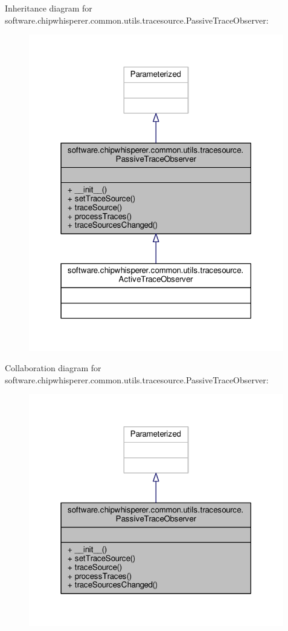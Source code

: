 Inheritance diagram for software.\+chipwhisperer.\+common.\+utils.\+tracesource.\+Passive\+Trace\+Observer\+:\nopagebreak
\begin{figure}[H]
\begin{center}
\leavevmode
\includegraphics[width=316pt]{d2/d85/classsoftware_1_1chipwhisperer_1_1common_1_1utils_1_1tracesource_1_1PassiveTraceObserver__inherit__graph}
\end{center}
\end{figure}


Collaboration diagram for software.\+chipwhisperer.\+common.\+utils.\+tracesource.\+Passive\+Trace\+Observer\+:\nopagebreak
\begin{figure}[H]
\begin{center}
\leavevmode
\includegraphics[width=316pt]{dc/dad/classsoftware_1_1chipwhisperer_1_1common_1_1utils_1_1tracesource_1_1PassiveTraceObserver__coll__graph}
\end{center}
\end{figure}


